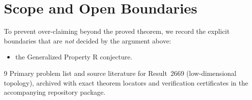 \documentclass[10pt,reqno]{amsart}
\theoremstyle{definition}
\begin{document}
\section{Scope and Open Boundaries}

To prevent over-claiming beyond the proved theorem, we record the explicit boundaries that are \emph{not} decided by the argument above:
\begin{itemize}
  \item the Generalized Property R conjecture.
\end{itemize}

\begin{thebibliography}{9}
Primary problem list and source literature for Result~2669 (low-dimensional topology), archived with exact theorem locators and verification certificates in the accompanying repository package.
\end{thebibliography}
\end{document}
